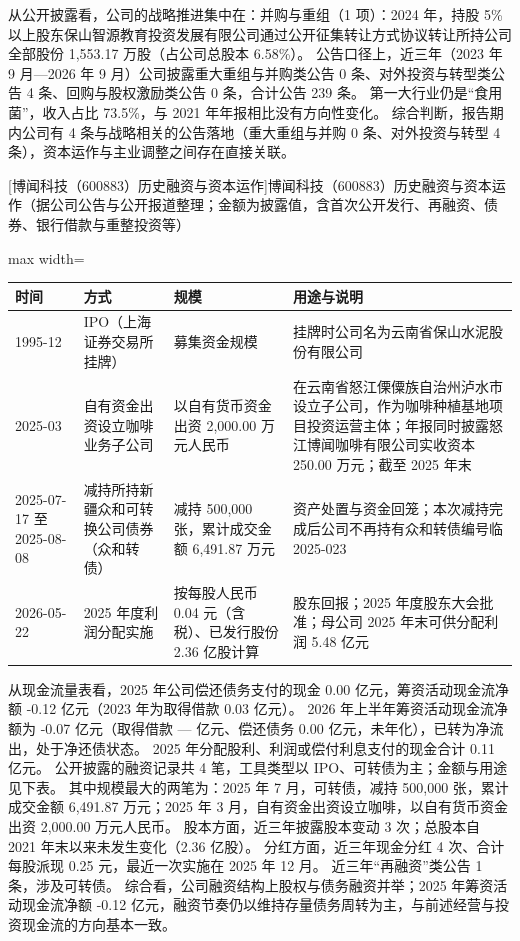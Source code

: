  从公开披露看，公司的战略推进集中在：并购与重组（1 项）：2024 年，持股 5\% 以上股东保山智源教育投资发展有限公司通过公开征集转让方式协议转让所持公司全部股份 1,553.17 万股（占公司总股本 6.58\%）。 公告口径上，近三年（2023 年 9 月---2026 年 9 月）公司披露重大重组与并购类公告 0 条、对外投资与转型类公告 4 条、回购与股权激励类公告 0 条，合计公告 239 条。 第一大行业仍是“食用菌”，收入占比 73.5\%，与 2021 年年报相比没有方向性变化。 综合判断，报告期内公司有 4 条与战略相关的公告落地（重大重组与并购 0 条、对外投资与转型 4 条），资本运作与主业调整之间存在直接关联。

\begin{center}\small\setlength{\tabcolsep}{4pt}
[博闻科技（600883）历史融资与资本运作]{博闻科技（600883）历史融资与资本运作（据公司公告与公开报道整理；金额为披露值，含首次公开发行、再融资、债券、银行借款与重整投资等）}
\begin{adjustbox}{max width=\textwidth}
\begin{tabular}{@{}p{1.45cm}p{2.55cm}p{4.05cm}p{4.95cm}@{}}
\toprule
时间 & 方式 & 规模 & 用途与说明 \\
\midrule
1995-12 & IPO（上海证券交易所挂牌） & 募集资金规模 & 挂牌时公司名为云南省保山水泥股份有限公司 \\
2025-03 & 自有资金出资设立咖啡业务子公司 & 以自有货币资金出资 2,\allowbreak{}000.00 万元人民币 & 在云南省怒江傈僳族自治州泸水市设立子公司，\allowbreak{}作为咖啡种植基地项目投资运营主体；年报同时披露怒江博闻咖啡有限公司实收资本 250.00 万元；截至 2025 年末 \\
2025-07-17 至 2025-08-08 & 减持所持新疆众和可转换公司债券（众和转债） & 减持 500,\allowbreak{}000 张，\allowbreak{}累计成交金额 6,\allowbreak{}491.87 万元 & 资产处置与资金回笼；本次减持完成后公司不再持有众和转债编号临 2025-023 \\
2026-05-22 & 2025 年度利润分配实施 & 按每股人民币 0.04 元（含税）、\allowbreak{}已发行股份 2.36 亿股计算 & 股东回报；2025 年度股东大会批准；母公司 2025 年末可供分配利润 5.48 亿元 \\
\bottomrule
\end{tabular}
\end{adjustbox}
\end{center}

 从现金流量表看，2025 年公司偿还债务支付的现金 0.00 亿元，筹资活动现金流净额 -0.12 亿元（2023 年为取得借款 0.03 亿元）。 2026 年上半年筹资活动现金流净额为 -0.07 亿元（取得借款 — 亿元、偿还债务 0.00 亿元，未年化），已转为净流出，处于净还债状态。 2025 年分配股利、利润或偿付利息支付的现金合计 0.11 亿元。 公开披露的融资记录共 4 笔，工具类型以 IPO、可转债为主；金额与用途见下表。 其中规模最大的两笔为：2025 年 7 月，可转债，减持 500,000 张，累计成交金额 6,491.87 万元；2025 年 3 月，自有资金出资设立咖啡，以自有货币资金出资 2,000.00 万元人民币。 股本方面，近三年披露股本变动 3 次；总股本自 2021 年末以来未发生变化（2.36 亿股）。 分红方面，近三年现金分红 4 次、合计每股派现 0.25 元，最近一次实施在 2025 年 12 月。 近三年“再融资”类公告 1 条，涉及可转债。 综合看，公司融资结构上股权与债务融资并举；2025 年筹资活动现金流净额 -0.12 亿元，融资节奏仍以维持存量债务周转为主，与前述经营与投资现金流的方向基本一致。

